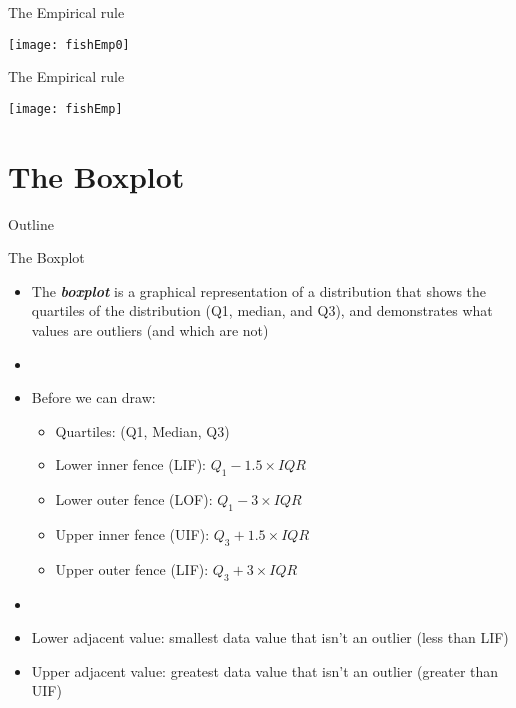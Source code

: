 \documentclass[xcolor=dvipsnames]{beamer}
\begin{document}
\begin{frame}{The Empirical rule}
	\begin{center}
		\texttt{[image: fishEmp0]}
	\end{center}
\end{frame}

\begin{frame}{The Empirical rule}
	\begin{center}
		\texttt{[image: fishEmp]}
	\end{center}
\end{frame}

\section{The Boxplot}
\begin{frame}{Outline}
	\tableofcontents[currentsection,subsectionstyle=show/shaded/hide]
\end{frame}

\begin{frame}{The Boxplot}
	\begin{itemize}
		\item The \textbf{\emph{boxplot}} is a graphical representation of a distribution that shows the quartiles of the distribution (Q1, median, and Q3), and demonstrates what values are outliers (and which are not) \pause
		\item[] 
		\item Before we can draw: \pause
		\begin{itemize}
			\item Quartiles: (Q1, Median, Q3)
			\item Lower inner fence (LIF): $Q_1 - 1.5 \times IQR$ \pause
			\item Lower outer fence (LOF): $Q_1 - 3 \times IQR$ \pause
			\item Upper inner fence (UIF): $Q_3 + 1.5 \times IQR$ \pause
			\item Upper outer fence (LIF): $Q_3 + 3 \times IQR$ \pause
		\end{itemize}
	\item[]
	\item Lower adjacent value: smallest data value that isn't an outlier (less than LIF) \pause
	\item Upper adjacent value: greatest data value that isn't an outlier (greater than UIF)
	\end{itemize}
\end{frame}
\end{document}
